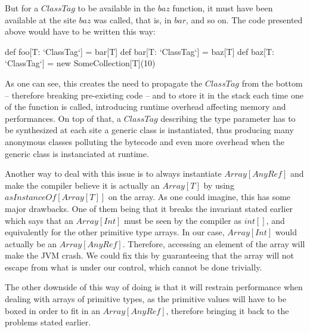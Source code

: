 But for a $ClassTag$ to be available in the $baz$ function, it must have been available at the site $baz$ was called, that is, in $bar$, and so on. The code presented above would have to be written this way:
 
\begin{lstlisting-nobreak}
  def foo[T: `ClassTag`] = bar[T]
  def bar[T: `ClassTag`] = baz[T]
  def baz[T: `ClassTag`] = new SomeCollection[T](10)
\end{lstlisting-nobreak}

As one can see, this creates the need to propagate the $ClassTag$ from the bottom -- therefore breaking pre-existing code -- and to store it in the stack each time one of the function is called, introducing runtime overhead affecting memory and performances. On top of that, a $ClassTag$ describing the type parameter has to be synthesized at each site a generic class is instantiated, thus producing many anonymous classes polluting the bytecode and even more overhead when the generic class is instanciated at runtime.  


Another way to deal with this issue is to always instantiate $Array[AnyRef]$ and make the compiler believe it is actually an $Array[T]$ by using $asInstanceOf[Array[T]]$ on the array. As one could imagine, this has some major drawbacks. One of them being that it breaks the invariant stated earlier which says that an $Array[Int]$ must be seen by the compiler as $int[]$, and equivalently for the other primitive type arrays. In our case, $Array[Int]$ would actually be an $Array[AnyRef]$. Therefore, accessing an element of the array will make the JVM crash. We could fix this by guaranteeing that the array will not escape from what is under our control, which cannot be done trivially. 


The other downside of this way of doing is that it will restrain performance when dealing with arrays of primitive types, as the primitive values will have to be boxed in order to fit in an $Array[AnyRef]$, therefore bringing it back to the problems stated earlier. 

